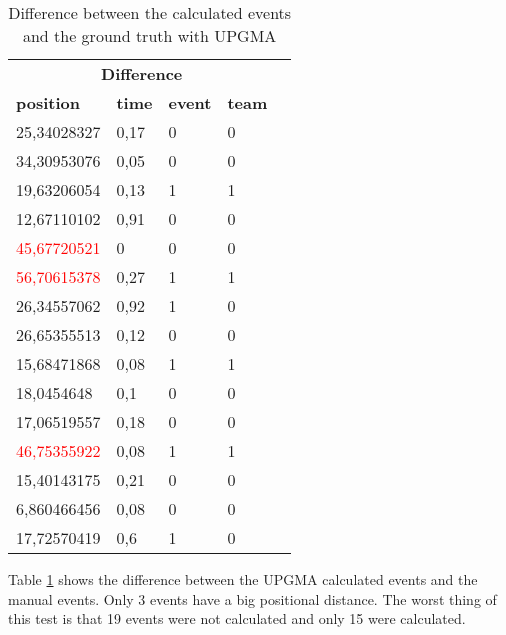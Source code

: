 \begin{table}[H]
    \begin{center}
		\begin{tabular}{|l|l|l|l|l}
			\hline
            \multicolumn{4}{|c|}{\large \textbf{Difference}} \\
			\hhline{====}
			\textbf{position} & \textbf{time} & \textbf{event} & \textbf{team} \\
			\hline
			25,34028327 & 0,17 & 0 & 0\\
			\hline
            34,30953076 & 0,05 & 0 & 0\\
			\hline
            19,63206054 & 0,13 & 1 & 1\\
			\hline
            12,67110102 & 0,91 & 0 & 0\\
			\hline
            \textcolor{red}{45,67720521} & 0 & 0 & 0\\
			\hline
            \textcolor{red}{56,70615378} & 0,27 & 1 & 1\\
			\hline
            26,34557062 & 0,92 & 1 & 0\\
			\hline
            26,65355513 & 0,12 & 0 & 0\\
			\hline
            15,68471868 & 0,08 & 1 & 1\\
			\hline
            18,0454648 & 0,1 & 0 & 0\\
			\hline
            17,06519557 & 0,18 & 0 & 0\\
			\hline
            \textcolor{red}{46,75355922} & 0,08 & 1 & 1\\
			\hline
            15,40143175 & 0,21 & 0 & 0\\
			\hline
            6,860466456 & 0,08 & 0 & 0\\
			\hline
            17,72570419 & 0,6 & 1 & 0\\
			\hline
		\end{tabular}
    \end{center}
    \caption{Difference between the calculated events and the ground truth with UPGMA}
    \label{fig:diff:sec:UPGMA}
\end{table}

Table \ref{fig:diff:sec:UPGMA} shows the difference between the UPGMA calculated events and the manual events. Only 3 events have a big positional distance. The worst thing of this test is that 19 events were not calculated and only 15 were calculated.



